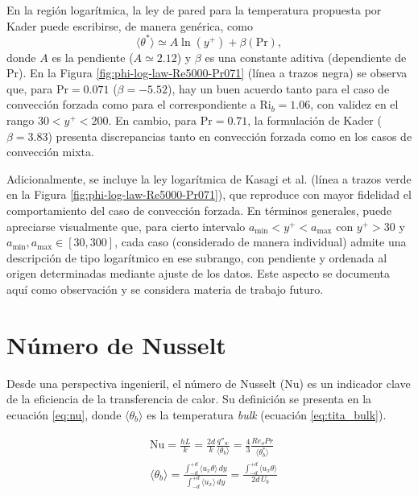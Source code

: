 En la región logarítmica, la ley de pared para la temperatura propuesta por Kader \cite{kader1981temperature} puede escribirse, de manera genérica, como
\begin{equation*}
\langle \theta^* \rangle \simeq A \ln(y^+) + \beta(\text{Pr}),
\end{equation*}
donde $A$ es la pendiente ($A \simeq 2\text{.}12$) y $\beta$ es una constante aditiva (dependiente de $\text{Pr}$). En la Figura \ref{fig:phi-log-law-Re5000-Pr071} (línea a trazos negra) se observa que, para $\text{Pr}=0\text{.}071$ ($\beta=-5\text{.}52$), hay un buen acuerdo tanto para el caso de convección forzada como para el correspondiente a $\text{Ri}_b=1\text{.}06$, con validez en el rango $30<y^+<200$. En cambio, para $\text{Pr}=0\text{.}71$, la formulación de Kader ($\beta=3\text{.}83$) presenta discrepancias tanto en convección forzada como en los casos de convección mixta.

Adicionalmente, se incluye la ley logarítmica de Kasagi et al. \cite{kasagi1992direct} (línea a trazos verde en la Figura \ref{fig:phi-log-law-Re5000-Pr071}), que reproduce con mayor fidelidad el comportamiento del caso de convección forzada. En términos generales, puede apreciarse visualmente que, para cierto intervalo $a_{\text{min}}<y^+<a_{\text{max}}$ con $y^+>30$ y $a_{\text{min}},a_{\text{max}}\in[30,300]$, cada caso (considerado de manera individual) admite una descripción de tipo logarítmico en ese subrango, con pendiente y ordenada al origen determinadas mediante ajuste de los datos. Este aspecto se documenta aquí como observación y se considera materia de trabajo futuro.



\newpage
\section{Número de Nusselt} \label{sec:nu}

Desde una perspectiva ingenieril, el número de Nusselt (Nu) es un indicador clave de la eficiencia de la transferencia de calor. Su definición se presenta en la ecuación \ref{eq:nu}, donde $\langle \theta_b \rangle$ es la temperatura \textit{bulk} (ecuación \ref{eq:tita_bulk}).

\begin{align}
&\text{Nu} = \frac{h L}{k} = \frac{2d}{k} \frac{q''_w}{\langle \theta_b \rangle} = \frac{4}{3} \frac{Re_o Pr}{\langle \theta^*_b \rangle}	
\label{eq:nu} \\
&\langle \theta_b \rangle = \frac{\int_{-d}^{+d} \langle u_x \theta \rangle \, dy}{\int_{-d}^{+d} \langle u_x \rangle \, dy} = \frac{\int_{-d}^{+d} \langle u_x \theta \rangle }{2d \, U_b}
\label{eq:tita_bulk}
\end{align}

